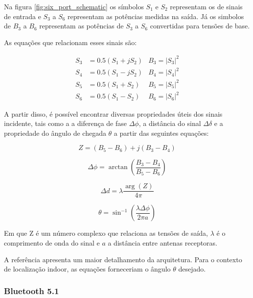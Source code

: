 Na figura \ref{fig:six_port_schematic} os símbolos \( S_1 \) e \( S_2 \) representam os de sinais de entrada e \( S_3 \) a \( S_6 \) representam as potências medidas na saída. Já os simbolos de \( B_3 \) a \( B_6 \) representam as potências de \( S_3 \) a \( S_6 \) convertidas para tensões de base.

As equações que relacionam esses sinais são:

\begin{align*}
    S_3 & = 0.5(S_1 + jS_2) & B_3 = \left | S_3 \right | ^2\\
    S_4 & = 0.5(S_1 - jS_2) & B_4 = \left | S_4 \right | ^2\\
    S_5 & = 0.5(S_1 + S_2)  & B_5 = \left | S_5 \right | ^2\\
    S_6 & = 0.5(S_1 - S_2)  & B_6 = \left | S_6 \right | ^2
\end{align*}

A partir disso, é possível encontrar diversas propriedades úteis dos sinais incidente, tais como a a diferença de fase \( \Delta\phi\), a distância do sinal \( \Delta\delta\) e a propriedade do ângulo de chegada \(\theta\) a partir das seguintes equações:

\begin{equation}
    Z = (B_5 - B_6) + j(B_3 - B_4)
\end{equation}

\begin{equation}
    \Delta \phi = \arctan \left ( \frac{B_3-B_4}{B_5-B_6} \right )
\end{equation}

\begin{equation}
    \Delta d = \lambda \frac{\arg\left ({Z}  \right ) }{4\pi }
\end{equation}

\begin{equation} \label{eq:eq_AoA}
    \theta = \sin^{-1}{(\frac{\lambda \Delta \phi}{2\pi a} )}
\end{equation}

Em que Z é um número complexo que relaciona as tensões de saída, \(\lambda\) é o comprimento de onda do sinal e \(a\) a distância entre antenas receptoras.

A referência \cite{art15} apresenta um maior detalhamento da arquitetura. Para o contexto de localização indoor, as equações forneceriam o ângulo \(\theta\) desejado.

\subsubsection{Bluetooth 5.1}

